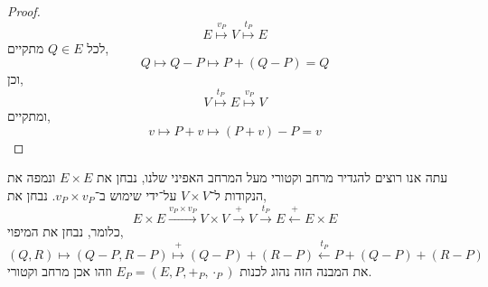 \begin{proof}
	\[
		E \overset{v_P}{\mapsto} V
		\overset{t_P}{\mapsto} E
	\]
	לכל $Q \in E$ מתקיים,
	\[
		Q
		\mapsto Q - P
		\mapsto P + (Q - P)
		= Q
	\]
	וכן,
	\[
		V \overset{t_P}{\mapsto} E
		\overset{v_P}{\mapsto} V
	\]
	ומתקיים,
	\[
		v
		\mapsto P + v
		\mapsto (P + v) - P
		= v
	\]
\end{proof}
עתה אנו רוצים להגדיר מרחב וקטורי מעל המרחב האפיני שלנו, נבחן את $E \times E$ ונמפה את הנקודות ל־$V \times V$ על־ידי שימוש ב־$v_P \times v_P$.
נבחן את,
\[
	E \times E
	\xrightarrow{v_P \times v_P} V \times V
	\xrightarrow{+} V
	\xrightarrow{t_P} E
	\xleftarrow{+} E \times E
\]
כלומר, נבחן את המיפוי,
\[
	(Q, R)
	\mapsto (Q - P, R - P)
	\overset{+}{\mapsto}  (Q - P) + (R - P)
	\overset{t_P}{\leftarrow} P + (Q - P) + (R - P)
\]
את המבנה הזה נהוג לכנות $E_P = (E, P, +_P, \cdot_P)$ וזהו אכן מרחב וקטורי.

